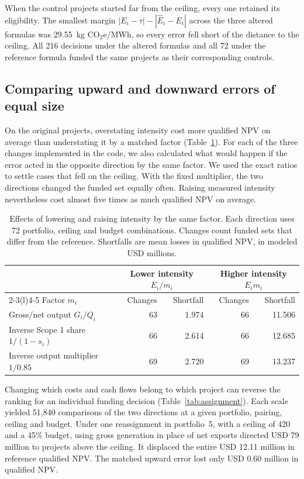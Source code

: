 \documentclass[ijfs,article,submit,oneauthor]{Definitions/mdpi}
\newcommand{\unit}{kg CO$_2$e/MWh}
\begin{document}
When the control projects started far from the ceiling, every one retained its eligibility. The smallest margin $|E_i-\tau|-|\widehat E_i-E_i|$ across the three altered formulas was 29.55~\unit, so every error fell short of the distance to the ceiling. All 216 decisions under the altered formulas and all 72 under the reference formula funded the same projects as their corresponding controls.

\subsection{Comparing upward and downward errors of equal size}
On the original projects, overstating intensity cost more qualified NPV on average than understating it by a matched factor (Table~\ref{tab:matched}). For each of the three changes implemented in the code, we also calculated what would happen if the error acted in the opposite direction by the same factor. We used the exact ratios to settle cases that fell on the ceiling. With the fixed multiplier, the two directions changed the funded set equally often. Raising measured intensity nevertheless cost almost five times as much qualified NPV on average.

\begin{table}[!htb]\centering
\caption{Effects of lowering and raising intensity by the same factor. Each direction uses 72 portfolio, ceiling and budget combinations. Changes count funded sets that differ from the reference. Shortfalls are mean losses in qualified NPV, in modeled USD millions.}\label{tab:matched}
\small\begin{tabularx}{.98\linewidth}{@{}Xrrrr@{}}\toprule
 & \multicolumn{2}{c}{Lower intensity $E_i/m_i$} & \multicolumn{2}{c}{Higher intensity $E_i m_i$}\\
\cmidrule(lr){2-3}\cmidrule(l){4-5}
Factor $m_i$ & Changes & Shortfall & Changes & Shortfall\\\midrule
Gross/net output $G_i/Q_i$ &63&1.974&66&11.506\\
Inverse Scope 1 share $1/(1-s_i)$ &66&2.614&66&12.685\\
Inverse output multiplier $1/0.85$ &69&2.720&69&13.237\\\bottomrule
\end{tabularx}
\end{table}

Changing which costs and cash flows belong to which project can reverse the ranking for an individual funding decision (Table~\ref{tab:assignment}). Each scale yielded 51,840 comparisons of the two directions at a given portfolio, pairing, ceiling and budget. Under one reassignment in portfolio~5, with a ceiling of 420 and a 45\% budget, using gross generation in place of net exports directed USD 79 million to projects above the ceiling. It displaced the entire USD 12.11 million in reference qualified NPV. The matched upward error lost only USD 0.60 million in qualified NPV.
\end{document}
